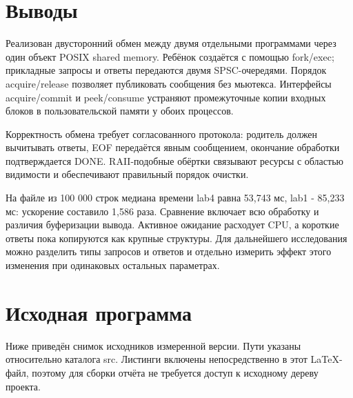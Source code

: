 \documentclass[12pt,a4paper,oneside,fleqn]{article}
\begin{document}
\clearpage
\section{Выводы}
Реализован двусторонний обмен между двумя отдельными программами через один
объект POSIX shared memory. Ребёнок создаётся с помощью fork/exec;
прикладные запросы и ответы передаются двумя SPSC-очередями.
Порядок acquire/release позволяет публиковать сообщения без мьютекса.
Интерфейсы acquire/commit и peek/consume устраняют промежуточные копии входных
блоков в пользовательской памяти у обоих процессов.

Корректность обмена требует согласованного протокола: родитель должен
вычитывать ответы, EOF передаётся явным сообщением, окончание обработки
подтверждается DONE. RAII-подобные обёртки связывают ресурсы с областью
видимости и обеспечивают правильный порядок очистки.

На файле из 100 000 строк медиана времени lab4 равна 53,743 мс,
lab1 - 85,233 мс: ускорение составило 1,586 раза. Сравнение включает всю
обработку и различия буферизации вывода. Активное ожидание расходует CPU,
а короткие ответы пока копируются как крупные структуры. Для дальнейшего
исследования можно разделить типы запросов и ответов и отдельно измерить
эффект этого изменения при одинаковых остальных параметрах.

\clearpage
\section{Исходная программа}
Ниже приведён снимок исходников измеренной версии. Пути указаны относительно
каталога src. Листинги включены непосредственно в этот LaTeX-файл, поэтому
для сборки отчёта не требуется доступ к исходному дереву проекта.
\end{document}

